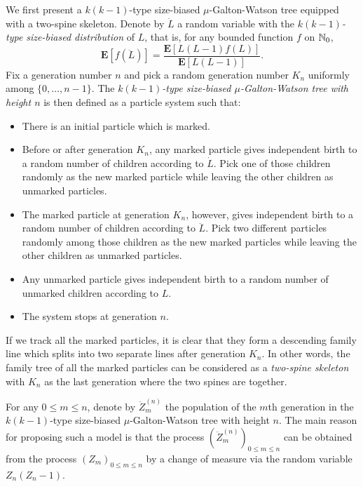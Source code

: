 \documentclass[12pt]{amsart}
\numberwithin{equation}{section}
\newcommand{\defn}[1]{{\em #1}}
\newcommand{\expr}[1]{\left( #1 \right)}
\newcommand{\brac}[1]{\left[ #1 \right]}
\newcommand{\expct}{\mathbf E}
\begin{document}
We first present a $k(k-1)$-type size-biased $\mu$-Galton-Watson tree equipped 
with a two-spine skeleton.
	Denote by $\ddot L$ a random variable with the \defn{$k(k-1)$-type size-biased distribution} of $L$, that is, for any
		bounded function $f$ on $\mathbb N_0$,
\begin{equation*}
		\expct\brac{f\expr{\ddot L}}
	=
		\frac{\expct\brac{L(L-1)f(L)}}{\expct\brac{L(L-1)}}.
\end{equation*}
	Fix a generation number $n$ and pick a random generation number $K_n$ uniformly among
		$\{0,\dots,n-1\}$.
	The \defn{$k(k-1)$-type size-biased $\mu$-Galton-Watson tree with height $n$} is then defined as a particle system such that:
\begin{itemize}
\item
	There is an initial particle which is marked.
\item
	Before or after generation $K_n$, any marked particle gives independent birth to a random number of children according to $\dot L$.
	Pick one of those children randomly as the new marked particle while leaving the other children as unmarked particles.
\item
	The marked particle at generation $K_n$, however, gives independent birth to a random number of children according to $\ddot L$.
	Pick two different particles randomly among those children as the new marked particles while leaving the other children as unmarked particles.
\item
	Any unmarked particle gives independent birth to a random number of unmarked children according to $L$.
\item
	The system stops at generation $n$.
\end{itemize}
\par
	If we track all the marked particles, it is clear that they form a descending family line which splits into two separate lines after generation $K_n$.
	In other words, the family tree of all the marked particles can be considered as a \defn{two-spine skeleton} with $K_n$ as the last generation where the two spines are together.
\par	
	For any $0\le m \le n$, denote by $\ddot Z_m^{(n)}$ the population of the 
	$m$th generation in the $k(k-1)$-type size-biased 
$\mu$-Galton-Watson tree with height $n$.
	The main reason for proposing such a model is that the process $(\ddot Z_m^{(n)})_{0\le m\le n}$ can be obtained from the process $(Z_m)_{0\le m\le n}$ by a change of measure via the random variable $Z_n(Z_n-1)$.
\end{document}
